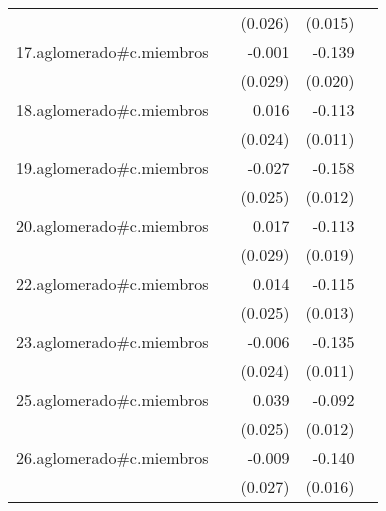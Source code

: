 {\begin{longtable}{l*{4}{D{.}{.}{-1}}}
            &                     &     (0.026)         &     (0.015)         &                     \\
\addlinespace
17.aglomerado#c.miembros&                     &      -0.001         &      -0.139\sym{***}&                     \\
            &                     &     (0.029)         &     (0.020)         &                     \\
\addlinespace
18.aglomerado#c.miembros&                     &       0.016         &      -0.113\sym{***}&                     \\
            &                     &     (0.024)         &     (0.011)         &                     \\
\addlinespace
19.aglomerado#c.miembros&                     &      -0.027         &      -0.158\sym{***}&                     \\
            &                     &     (0.025)         &     (0.012)         &                     \\
\addlinespace
20.aglomerado#c.miembros&                     &       0.017         &      -0.113\sym{***}&                     \\
            &                     &     (0.029)         &     (0.019)         &                     \\
\addlinespace
22.aglomerado#c.miembros&                     &       0.014         &      -0.115\sym{***}&                     \\
            &                     &     (0.025)         &     (0.013)         &                     \\
\addlinespace
23.aglomerado#c.miembros&                     &      -0.006         &      -0.135\sym{***}&                     \\
            &                     &     (0.024)         &     (0.011)         &                     \\
\addlinespace
25.aglomerado#c.miembros&                     &       0.039         &      -0.092\sym{***}&                     \\
            &                     &     (0.025)         &     (0.012)         &                     \\
\addlinespace
26.aglomerado#c.miembros&                     &      -0.009         &      -0.140\sym{***}&                     \\
            &                     &     (0.027)         &     (0.016)         &                     \\

\end{longtable}}
